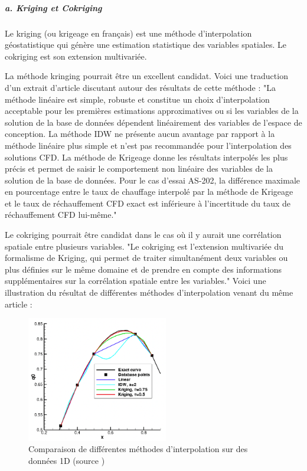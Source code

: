 \subparagraph{a. Kriging et Cokriging} %
Le kriging (ou krigeage en français) est une méthode d'interpolation géostatistique qui génère une estimation statistique des variables spatiales. Le cokriging est son extension multivariée. 

La méthode kringing pourrait être un excellent candidat. Voici une traduction d'un extrait d'article discutant autour des résultats de cette méthode :
"La méthode linéaire est simple, robuste et constitue un choix d'interpolation acceptable pour les premières estimations approximatives ou si les variables de la solution de la base de données dépendent linéairement des variables de l'espace de conception. La méthode IDW ne présente aucun avantage par rapport à la méthode linéaire plus simple et n'est pas recommandée pour l'interpolation des solutions CFD. La méthode de Krigeage donne les résultats interpolés les plus précis et permet de saisir le comportement non linéaire des variables de la solution de la base de données. Pour le cas d'essai AS-202, la différence maximale en pourcentage entre le taux de chauffage interpolé par la méthode de Krigeage et le taux de réchauffement CFD exact est inférieure à l'incertitude du taux de réchauffement CFD lui-même." \cite{palmer2009}


Le cokriging pourrait être candidat dans le cas où il y aurait une corrélation spatiale entre plusieurs variables.
"Le cokriging est l'extension multivariée du formalisme de Kriging, qui permet de traiter simultanément deux variables ou plus définies sur le même domaine et de prendre en compte des informations supplémentaires sur la corrélation spatiale entre les variables." \cite{kringing}
Voici une illustration du résultat de différentes méthodes d'interpolation venant du même article :

\begin{figure}[H]
    \centering
    \includegraphics[width=0.55\textwidth]{images/palmer2009_comp_copie.png}
    \caption{Comparaison de différentes méthodes d'interpolation sur des données 1D (source \cite{palmer2009})}
    \label{fig:compar}
\end{figure}


